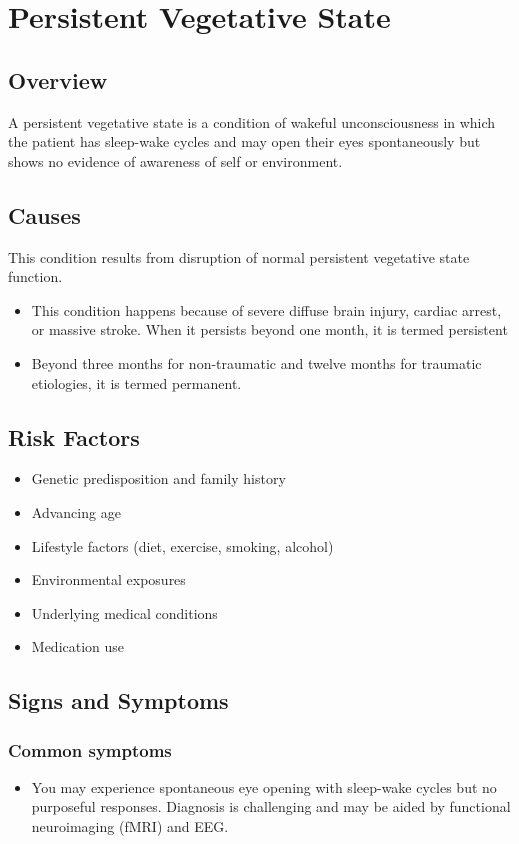 \chapter{Persistent Vegetative State}
\label{sec:Persistent Vegetative State}

\section{Overview}
A persistent vegetative state is a condition of wakeful unconsciousness in which the patient has sleep-wake cycles and may open their eyes spontaneously but shows no evidence of awareness of self or environment.
\section{Causes}
This condition results from disruption of normal persistent vegetative state function.

\begin{itemize}[noitemsep]
  \item This condition happens because of severe diffuse brain injury, cardiac arrest, or massive stroke. When it persists beyond one month, it is termed persistent
  \item Beyond three months for non-traumatic and twelve months for traumatic etiologies, it is termed permanent.
\end{itemize}
\section{Risk Factors}


\begin{itemize}[noitemsep]
  \item Genetic predisposition and family history
  \item Advancing age
  \item Lifestyle factors (diet, exercise, smoking, alcohol)
  \item Environmental exposures
  \item Underlying medical conditions
  \item Medication use
\end{itemize}
\section{Signs and Symptoms}

\subsection{Common symptoms}
\begin{itemize}[noitemsep]
  \item You may experience spontaneous eye opening with sleep-wake cycles but no purposeful responses. Diagnosis is challenging and may be aided by functional neuroimaging (fMRI) and EEG. 
  \end{itemize}

